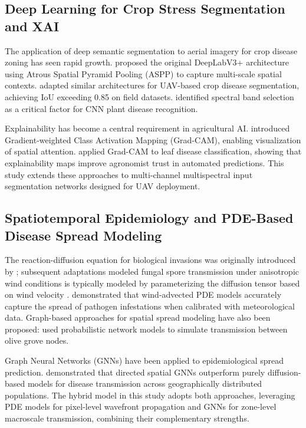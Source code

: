 \documentclass[review,3p,times,authoryear]{elsarticle}
\begin{document}
\subsection{Deep Learning for Crop Stress Segmentation and XAI}
The application of deep semantic segmentation to aerial imagery for crop disease zoning has seen rapid growth. \citet{chen2018deeplab} proposed the original DeepLabV3+ architecture using Atrous Spatial Pyramid Pooling (ASPP) to capture multi-scale spatial contexts. \citet{sa2016deepfruits} adapted similar architectures for UAV-based crop disease segmentation, achieving IoU exceeding 0.85 on field datasets. \citet{barbedo2019plant} identified spectral band selection as a critical factor for CNN plant disease recognition.

Explainability has become a central requirement in agricultural AI. \citet{selvaraju2017gradcam} introduced Gradient-weighted Class Activation Mapping (Grad-CAM), enabling visualization of spatial attention. \citet{paymode2022transfer} applied Grad-CAM to leaf disease classification, showing that explainability maps improve agronomist trust in automated predictions. This study extends these approaches to multi-channel multispectral input segmentation networks designed for UAV deployment.

\subsection{Spatiotemporal Epidemiology and PDE-Based Disease Spread Modeling}
The reaction-diffusion equation for biological invasions was originally introduced by \citet{fisher1937wave}; subsequent adaptations modeled fungal spore transmission under anisotropic wind conditions is typically modeled by parameterizing the diffusion tensor based on wind velocity \citep{gilligan2008}. \citet{parnell2006} demonstrated that wind-advected PDE models accurately capture the spread of pathogen infestations when calibrated with meteorological data. Graph-based approaches for spatial spread modeling have also been proposed: \citet{cunniffe2016modeling} used probabilistic network models to simulate transmission between olive grove nodes.

Graph Neural Networks (GNNs) have been applied to epidemiological spread prediction. \citet{deng2022spatial} demonstrated that directed spatial GNNs outperform purely diffusion-based models for disease transmission across geographically distributed populations. The hybrid model in this study adopts both approaches, leveraging PDE models for pixel-level wavefront propagation and GNNs for zone-level macroscale transmission, combining their complementary strengths.
\end{document}
